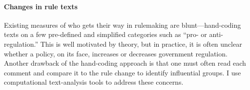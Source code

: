 \paragraph{Changes in rule texts}
Existing measures of who gets their way in rulemaking are blunt---hand-coding texts on a few pre-defined and simplified categories such as ``pro- or anti-regulation.'' This is well motivated by theory, but in practice, it is often unclear whether a policy, on its face, increases or decreases government regulation.%
Another drawback of the hand-coding approach is that one must often read each comment and compare it to the rule change to identify influential groups. %
I use computational text-analysis tools to address these concerns. %

